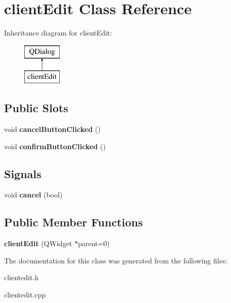 \hypertarget{classclient_edit}{}\section{client\+Edit Class Reference}
\label{classclient_edit}
Inheritance diagram for client\+Edit\+:\begin{figure}[H]
\begin{center}
\leavevmode
\includegraphics[height=2.000000cm]{classclient_edit}
\end{center}
\end{figure}
\subsection*{Public Slots}
\begin{DoxyCompactItemize}
\item 
void {\bfseries cancel\+Button\+Clicked} ()\hypertarget{classclient_edit_a5a4c7ccbd66ac3e59c0f0d01ea792628}{}\label{classclient_edit_a5a4c7ccbd66ac3e59c0f0d01ea792628}

\item 
void {\bfseries confirm\+Button\+Clicked} ()\hypertarget{classclient_edit_a4e6936dc6537bd38eb13b751fa009b21}{}\label{classclient_edit_a4e6936dc6537bd38eb13b751fa009b21}

\end{DoxyCompactItemize}
\subsection*{Signals}
\begin{DoxyCompactItemize}
\item 
void {\bfseries cancel} (bool)\hypertarget{classclient_edit_afca832860e833415b8f47b1761c388b3}{}\label{classclient_edit_afca832860e833415b8f47b1761c388b3}

\end{DoxyCompactItemize}
\subsection*{Public Member Functions}
\begin{DoxyCompactItemize}
\item 
{\bfseries client\+Edit} (Q\+Widget $\ast$parent=0)\hypertarget{classclient_edit_ac539be9473e6b1525b92393c5dd5c871}{}\label{classclient_edit_ac539be9473e6b1525b92393c5dd5c871}

\end{DoxyCompactItemize}


The documentation for this class was generated from the following files\+:\begin{DoxyCompactItemize}
\item 
clientedit.\+h\item 
clientedit.\+cpp\end{DoxyCompactItemize}
